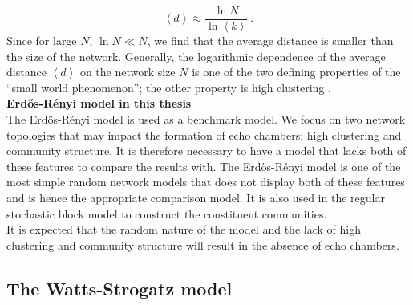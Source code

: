 \documentclass[11 pt , letterpaper , twoside , openright]{book}
\begin{document}
\begin{equation}\label{d}
	\left<d\right> \approx \frac{\ln{N}}{\ln{\left<k\right>}} \ .
\end{equation}
Since for large $N$, $\ln{N} \ll N$, we find that the average distance is smaller than the size of the network. Generally, the logarithmic dependence of the average distance $\left<d\right>$ on the network size $N$ is one of the two defining properties of the ``small world phenomenon''; the other property is high clustering \cite{Easley2010}.\\
\newline
\textbf{Erd\H{o}s-R\'{e}nyi model in this thesis}\\
\newline
The Erd\H{o}s-R\'{e}nyi model is used as a benchmark model. We focus on two network topologies that may impact the formation of echo chambers: high clustering and community structure. It is therefore necessary to have a model that lacks both of these features to compare the results with. The Erd\H{o}s-R\'{e}nyi model is one of the most simple random network models that does not display both of these features and is hence the appropriate comparison model. It is also used in the regular stochastic block model to construct the constituent communities.\\
\newline
It is expected that the random nature of the model and the lack of high clustering and community structure will result in the absence of echo chambers.

\subsection{The Watts-Strogatz model}
\end{document}
